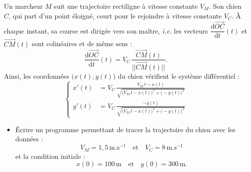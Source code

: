 Un marcheur $M$ suit une trajectoire rectiligne à vitesse constante $V_M$. Son chien $C$, qui part d'un point éloigné, court pour le rejoindre à vitesse constante $V_C$. \`{A} chaque instant, sa course est dirigée vers son maître, \textit{i.e.} les vecteurs $\dfrac{\text{d}\overrightarrow{OC}}{\text{d}t}(t)$ et $\overrightarrow{CM}(t)$ sont colinéaires et de même sens :
\[ \dfrac{\text{d}\overrightarrow{OC}}{\text{d}t}(t)=V_C\,\frac{\overrightarrow{CM}(t)}{\vert\vert\overrightarrow{CM}(t)\vert\vert}. \]
Ainsi, les coordonnées $\big(x(t),y(t)\big)$ du chien vérifient le système différentiel :
\[ \left\{ \begin{aligned} x'(t)&=V_C\,\frac{V_M\,t-x(t)}{\sqrt{\big( V_M\,t-x(t) \big)^2+\big( -y(t) \big)^2}} \\ y'(t)&=V_C\,\frac{-y(t)}{\sqrt{\big( V_M\,t-x(t) \big)^2+\big( -y(t) \big)^2}} \end{aligned} \right. \]
\begin{itemize}
	\item[\textbullet] \'{E}crire un programme permettant de tracer la trajectoire du chien avec les données :
		\[ V_M=1{,}5\,\text{m}.\text{s}^{-1} \quad \text{et} \quad V_C=8\,\text{m}.\text{s}^{-1} \]
		et la condition initiale :
		\[ x(0)=100\,\text{m} \quad \text{et} \quad y(0)=300\,\text{m}. \]
\end{itemize}